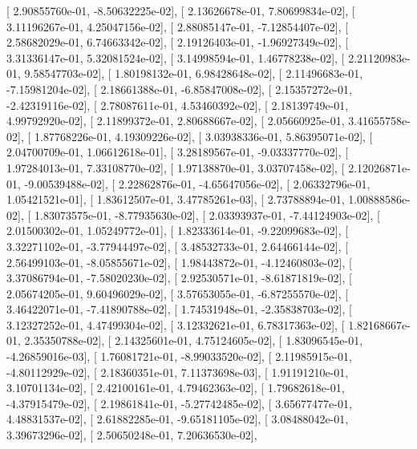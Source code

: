 \documentclass{article}
\begin{document}
       [  2.90855760e-01,  -8.50632225e-02],
       [  2.13626678e-01,   7.80699834e-02],
       [  3.11196267e-01,   4.25047156e-02],
       [  2.88085147e-01,  -7.12854407e-02],
       [  2.58682029e-01,   6.74663342e-02],
       [  2.19126403e-01,  -1.96927349e-02],
       [  3.31336147e-01,   5.32081524e-02],
       [  3.14998594e-01,   1.46778238e-02],
       [  2.21120983e-01,   9.58547703e-02],
       [  1.80198132e-01,   6.98428648e-02],
       [  2.11496683e-01,  -7.15981204e-02],
       [  2.18661388e-01,  -6.85847008e-02],
       [  2.15357272e-01,  -2.42319116e-02],
       [  2.78087611e-01,   4.53460392e-02],
       [  2.18139749e-01,   4.99792920e-02],
       [  2.11899372e-01,   2.80688667e-02],
       [  2.05660925e-01,   3.41655758e-02],
       [  1.87768226e-01,   4.19309226e-02],
       [  3.03938336e-01,   5.86395071e-02],
       [  2.04700709e-01,   1.06612618e-01],
       [  3.28189567e-01,  -9.03337770e-02],
       [  1.97284013e-01,   7.33108770e-02],
       [  1.97138870e-01,   3.03707458e-02],
       [  2.12026871e-01,  -9.00539488e-02],
       [  2.22862876e-01,  -4.65647056e-02],
       [  2.06332796e-01,   1.05421521e-01],
       [  1.83612507e-01,   3.47785261e-03],
       [  2.73788894e-01,   1.00888586e-02],
       [  1.83073575e-01,  -8.77935630e-02],
       [  2.03393937e-01,  -7.44124903e-02],
       [  2.01500302e-01,   1.05249772e-01],
       [  1.82333614e-01,  -9.22099683e-02],
       [  3.32271102e-01,  -3.77944497e-02],
       [  3.48532733e-01,   2.64466144e-02],
       [  2.56499103e-01,  -8.05855671e-02],
       [  1.98443872e-01,  -4.12460803e-02],
       [  3.37086794e-01,  -7.58020230e-02],
       [  2.92530571e-01,  -8.61871819e-02],
       [  2.05674205e-01,   9.60496029e-02],
       [  3.57653055e-01,  -6.87255570e-02],
       [  3.46422071e-01,  -7.41890788e-02],
       [  1.74531948e-01,  -2.35838703e-02],
       [  3.12327252e-01,   4.47499304e-02],
       [  3.12332621e-01,   6.78317363e-02],
       [  1.82168667e-01,   2.35350788e-02],
       [  2.14325601e-01,   4.75124605e-02],
       [  1.83096545e-01,  -4.26859016e-03],
       [  1.76081721e-01,  -8.99033520e-02],
       [  2.11985915e-01,  -4.80112929e-02],
       [  2.18360351e-01,   7.11373698e-03],
       [  1.91191210e-01,   3.10701134e-02],
       [  2.42100161e-01,   4.79462363e-02],
       [  1.79682618e-01,  -4.37915479e-02],
       [  2.19861841e-01,  -5.27742485e-02],
       [  3.65677477e-01,   4.48831537e-02],
       [  2.61882285e-01,  -9.65181105e-02],
       [  3.08488042e-01,   3.39673296e-02],
       [  2.50650248e-01,   7.20636530e-02],
\end{document}
